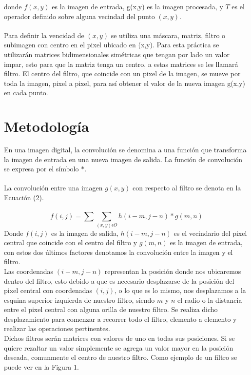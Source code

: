 \documentclass[conference]{IEEEtran}
\begin{document}
 donde $f(x,y)$ es la imagen de entrada, g(x,y) es la imagen procesada, y $T$ es el operador definido sobre alguna vecindad del punto $(x,y)$.\\\\ Para definir la vencidad de $(x,y)$ se utiliza una m\'ascara, matriz, filtro o subimagen con centro en el pixel ubicado en (x,y). Para esta pr\'actica se utilizar\'an matrices bidimensionales sim\'etricas que tengan por lado un valor impar, esto para que la matriz tenga un centro, a estas matrices se les llamar\'a filtro. El centro del filtro, que coincide con un pixel de la imagen, se mueve por toda la imagen, pixel a pixel, para as\'i obtener el valor de la nueva imagen g(x,y) en cada punto.

\section{Metodolog\'ia}
En una imagen digital, la convoluci\'on se denomina a una funci\'on que transforma la imagen de entrada en una nueva imagen de salida. La funci\'on de convoluci\'on se expresa por el s\'imbolo $\ast$.\\\\
La convoluci\'on entre una imagen $g(x,y)$ con respecto al filtro se denota en la Ecuaci\'on (2).\\\\
\begin{equation}
	f(i,j) = \sum\sum_{(x,y)\epsilon O} h(i-m,j-n)\ast g(m,n)
\end{equation}
Donde $f(i,j)$ es la imagen de salida, $h(i-m,j-n)$ es el vecindario del pixel central que coincide con el centro del filtro y $g(m,n)$ es la imagen de entrada, con estos dos \'ultimos factores denotamos la convoluci\'on entre la imagen y el filtro.\\ Las coordenadas $(i-m,j-n)$ representan la posici\'on donde nos ubicaremos dentro del filtro, esto debido a que es necesario desplazarse de la posici\'on del pixel central con coordenadas $(i,j)$, o lo que es lo mismo, nos desplazamos a la esquina superior izquierda de nuestro filtro, siendo $m$ y $n$ el radio o la distancia entre el pixel central con alguna orilla de nuestro filtro. Se realiza dicho desplazamiento para comenzar a recorrer todo el filtro, elemento a elemento y realizar las operaciones pertinentes.\\
Dichos filtros ser\'an matrices con valores de uno en todas sus posiciones. Si se quiere rezaltar un valor simplemente se agrega un valor mayor en la posici\'on deseada, comunmente el centro de nuestro filtro. Como ejemplo de un filtro se puede ver en la Figura 1.
\end{document}
